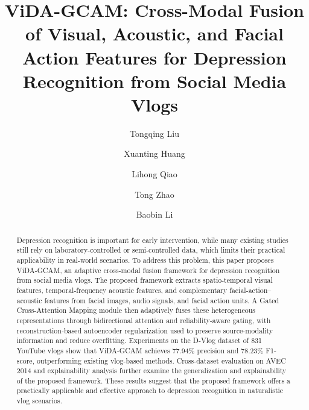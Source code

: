 \documentclass[a4paper,fleqn]{cas-dc}
\begin{document}
\let\WriteBookmarks\relax
\def\floatpagepagefraction{1}
\def\textpagefraction{.001}

\shorttitle{}    

\shortauthors{}  

 \title[mode=title]{ViDA-GCAM:  Cross-Modal Fusion of Visual, Acoustic, and Facial Action Features for Depression Recognition from Social Media Vlogs}

\author[1]{Tongqing Liu}
\author[1]{Xuanting Huang}
\author[2]{Lihong Qiao}
\author[3]{Tong Zhao}

\author[1]{Baobin Li}
\cormark[1]




\begin{abstract}
Depression recognition is important for early intervention, while many existing studies still rely on laboratory-controlled or semi-controlled data, which limits their practical applicability in real-world scenarios. To address this problem, this paper proposes ViDA-GCAM, an adaptive cross-modal fusion framework for depression recognition from social media vlogs. The proposed framework extracts spatio-temporal visual features, temporal-frequency acoustic features, and complementary facial-action–acoustic features from facial images, audio signals, and facial action units. A Gated Cross-Attention Mapping module then adaptively fuses these heterogeneous representations through bidirectional attention and reliability-aware gating, with reconstruction-based autoencoder regularization used to preserve source-modality information and reduce overfitting. Experiments on the D-Vlog dataset of 831 YouTube vlogs show that ViDA-GCAM achieves 77.94\% precision and 78.23\% F1-score, outperforming existing vlog-based methods. 
Cross-dataset evaluation on AVEC 2014 and explainability analysis further examine the generalization and explainability of the proposed framework.
These results suggest that the proposed framework offers a practically applicable and effective approach to depression recognition in naturalistic vlog scenarios.
\end{abstract}
\end{document}
